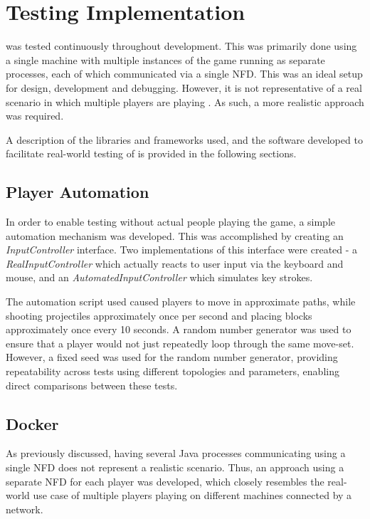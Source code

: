 \chapter{Testing Implementation}
\game{} was tested continuously throughout development. This was primarily done using a single machine with multiple instances of the game running as separate processes, each of which communicated via a single NFD. This was an ideal setup for design, development and debugging. However, it is not representative of a real scenario in which multiple players are playing \game{}. As such, a more realistic approach was required. 

A description of the libraries and frameworks used, and the software developed to facilitate real-world testing of \game{} is provided in the following sections.



\section{Player Automation}\label{sec:impl:automation}
In order to enable testing without actual people playing the game, a simple automation mechanism was developed. This was accomplished by creating an \textit{InputController} interface. Two implementations of this interface were created - a \textit{RealInputController} which actually reacts to user input via the keyboard and mouse, and an \textit{AutomatedInputController} which simulates key strokes.

The automation script used caused players to move in approximate paths, while shooting projectiles approximately once per second and placing blocks approximately once every 10 seconds. A random number generator was used to ensure that a player would not just repeatedly loop through the same move-set. However, a fixed seed was used for the random number generator, providing repeatability across tests using different topologies and parameters, enabling direct comparisons between these tests. 


\section{Docker}\label{sec:impl:test:docker}
As previously discussed, having several Java processes communicating using a single NFD does not represent a realistic scenario. Thus, an approach using a separate NFD for each player was developed, which closely resembles the real-world use case of multiple players playing on different machines connected by a network.

